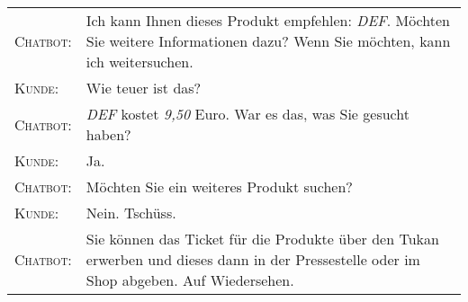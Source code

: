 \begin{center}
\begin{tabular}{p{}p{}}
	\textsc{Chatbot:} & Ich kann Ihnen dieses Produkt empfehlen: \textit{DEF}. Möchten Sie weitere Informationen dazu? Wenn Sie möchten, kann ich weitersuchen. \\
	\textsc{Kunde:} & Wie teuer ist das? \\
	\textsc{Chatbot:} & \textit{DEF} kostet \textit{9,50} Euro. War es das, was Sie gesucht haben? \\
	\textsc{Kunde:} & Ja. \\
	\textsc{Chatbot:} & Möchten Sie ein weiteres Produkt suchen? \\
	\textsc{Kunde:} & Nein. Tschüss. \\
	\textsc{Chatbot:} & Sie können das Ticket für die Produkte über den Tukan erwerben und dieses dann in der Pressestelle oder im Shop abgeben. Auf Wiedersehen.\\
	\end{tabular}
\end{center}
\vspace{12pt}


